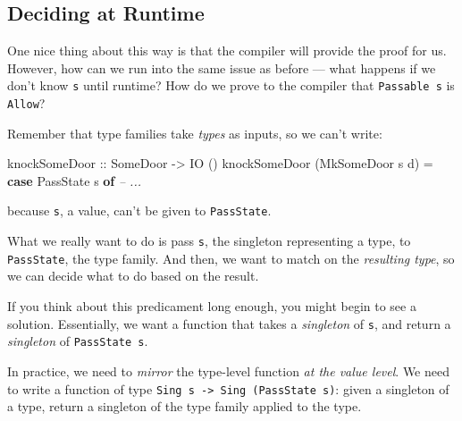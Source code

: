 \documentclass[]{article}
\newenvironment{Shaded}{}{}
\newcommand{\CommentTok}[1]{\textcolor[rgb]{0.38,0.63,0.69}{\textit{#1}}}
\newcommand{\DataTypeTok}[1]{\textcolor[rgb]{0.56,0.13,0.00}{#1}}
\newcommand{\FunctionTok}[1]{\textcolor[rgb]{0.02,0.16,0.49}{#1}}
\newcommand{\KeywordTok}[1]{\textcolor[rgb]{0.00,0.44,0.13}{\textbf{#1}}}
\newcommand{\NormalTok}[1]{#1}
\newcommand{\OtherTok}[1]{\textcolor[rgb]{0.00,0.44,0.13}{#1}}
\begin{document}
\hypertarget{deciding-at-runtime}{%
\subsection{Deciding at Runtime}\label{deciding-at-runtime}}

One nice thing about this way is that the compiler will provide the proof for
us. However, how can we run into the same issue as before --- what happens if we
don't know \texttt{s} until runtime? How do we prove to the compiler that
\texttt{Passable\ s} is \texttt{\textquotesingle{}Allow}?

Remember that type families take \emph{types} as inputs, so we can't write:

\begin{Shaded}
\begin{Highlighting}[]
\OtherTok{knockSomeDoor ::} \DataTypeTok{SomeDoor} \OtherTok{->} \DataTypeTok{IO}\NormalTok{ ()}
\NormalTok{knockSomeDoor (}\DataTypeTok{MkSomeDoor}\NormalTok{ s d) }\FunctionTok{=} \KeywordTok{case} \DataTypeTok{PassState}\NormalTok{ s }\KeywordTok{of}
                                  \CommentTok{-- ...}
\end{Highlighting}
\end{Shaded}

because \texttt{s}, a value, can't be given to \texttt{PassState}.

What we really want to do is pass \texttt{s}, the singleton representing a type,
to \texttt{PassState}, the type family. And then, we want to match on the
\emph{resulting type}, so we can decide what to do based on the result.

If you think about this predicament long enough, you might begin to see a
solution. Essentially, we want a function that takes a \emph{singleton} of
\texttt{s}, and return a \emph{singleton} of \texttt{PassState\ s}.

In practice, we need to \emph{mirror} the type-level function \emph{at the value
level}. We need to write a function of type
\texttt{Sing\ s\ -\textgreater{}\ Sing\ (PassState\ s)}: given a singleton of a
type, return a singleton of the type family applied to the type.
\end{document}
